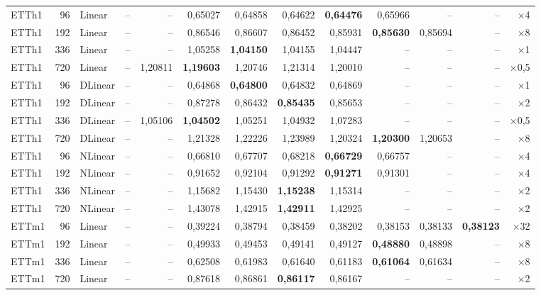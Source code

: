 {\begin{longtable}{@{}lrl rrrrrrrrr r@{}}
\addlinespace[2pt]
ETTh1 & 96 & Linear & -- & -- & 0{,}65027 & 0{,}64858 & 0{,}64622 & \textbf{0{,}64476} & 0{,}65966 & -- & -- & $\times$4 \\
ETTh1 & 192 & Linear & -- & -- & 0{,}86546 & 0{,}86607 & 0{,}86452 & 0{,}85931 & \textbf{0{,}85630} & 0{,}85694 & -- & $\times$8 \\
ETTh1 & 336 & Linear & -- & -- & 1{,}05258 & \textbf{1{,}04150} & 1{,}04155 & 1{,}04447 & -- & -- & -- & $\times$1 \\
ETTh1 & 720 & Linear & -- & 1{,}20811 & \textbf{1{,}19603} & 1{,}20746 & 1{,}21314 & 1{,}20010 & -- & -- & -- & $\times$0{,}5 \\
\addlinespace[2pt]
ETTh1 & 96 & DLinear & -- & -- & 0{,}64868 & \textbf{0{,}64800} & 0{,}64832 & 0{,}64869 & -- & -- & -- & $\times$1 \\
ETTh1 & 192 & DLinear & -- & -- & 0{,}87278 & 0{,}86432 & \textbf{0{,}85435} & 0{,}85653 & -- & -- & -- & $\times$2 \\
ETTh1 & 336 & DLinear & -- & 1{,}05106 & \textbf{1{,}04502} & 1{,}05251 & 1{,}04932 & 1{,}07283 & -- & -- & -- & $\times$0{,}5 \\
ETTh1 & 720 & DLinear & -- & -- & 1{,}21328 & 1{,}22226 & 1{,}23989 & 1{,}20324 & \textbf{1{,}20300} & 1{,}20653 & -- & $\times$8 \\
\addlinespace[2pt]
ETTh1 & 96 & NLinear & -- & -- & 0{,}66810 & 0{,}67707 & 0{,}68218 & \textbf{0{,}66729} & 0{,}66757 & -- & -- & $\times$4 \\
ETTh1 & 192 & NLinear & -- & -- & 0{,}91652 & 0{,}92104 & 0{,}91292 & \textbf{0{,}91271} & 0{,}91301 & -- & -- & $\times$4 \\
ETTh1 & 336 & NLinear & -- & -- & 1{,}15682 & 1{,}15430 & \textbf{1{,}15238} & 1{,}15314 & -- & -- & -- & $\times$2 \\
ETTh1 & 720 & NLinear & -- & -- & 1{,}43078 & 1{,}42915 & \textbf{1{,}42911} & 1{,}42925 & -- & -- & -- & $\times$2 \\
\addlinespace[2pt]
ETTm1 & 96 & Linear & -- & -- & 0{,}39224 & 0{,}38794 & 0{,}38459 & 0{,}38202 & 0{,}38153 & 0{,}38133 & \textbf{0{,}38123} & $\times$32 \\
ETTm1 & 192 & Linear & -- & -- & 0{,}49933 & 0{,}49453 & 0{,}49141 & 0{,}49127 & \textbf{0{,}48880} & 0{,}48898 & -- & $\times$8 \\
ETTm1 & 336 & Linear & -- & -- & 0{,}62508 & 0{,}61983 & 0{,}61640 & 0{,}61183 & \textbf{0{,}61064} & 0{,}61634 & -- & $\times$8 \\
ETTm1 & 720 & Linear & -- & -- & 0{,}87618 & 0{,}86861 & \textbf{0{,}86117} & 0{,}86167 & -- & -- & -- & $\times$2 \\

\end{longtable}}

